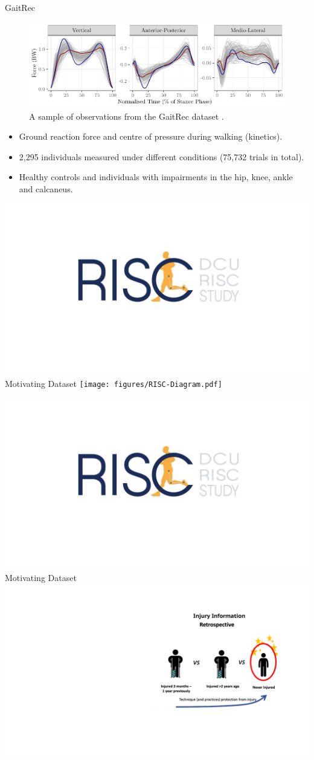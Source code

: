 \documentclass[aspectratio=128,xcolor=dvipsnames, notes]{beamer}
\newcommand{\1}{\mathbf{1}}
\begin{document}
\begin{frame}{GaitRec \parencite{horsak_gaitrec_2020}}

\begin{figure}
    \centering
    \includegraphics[width=0.8\linewidth]{figures/gaitrec-intro-plot.pdf}
    \caption{A sample of observations from the GaitRec dataset \parencite{horsak_gaitrec_2020}. }
    \label{fig:enter-label}
\end{figure}
\begin{itemize}
    \pause \item Ground reaction force and centre of pressure during walking (kinetics).
    \pause \item 2,295 individuals measured under different conditions (75,732 trials in total).
    \pause \item Healthy controls and individuals with impairments in the hip, knee, ankle and calcaneus.
\end{itemize}
\end{frame}

\begin{frame}{\includegraphics[width = 0.225 \textwidth]{figures/RISC-logo.pdf} Motivating Dataset}
\centering
\pause \texttt{[image: figures/RISC-Diagram.pdf]}    
\end{frame}


\begin{frame}{\includegraphics[width = 0.225 \textwidth]{figures/RISC-logo.pdf} Motivating Dataset}
    \centering  
    \includegraphics[width = 1\textwidth]{figures/Retro-Injury-Problem-Reduced.pdf}
\end{frame}
\end{document}
